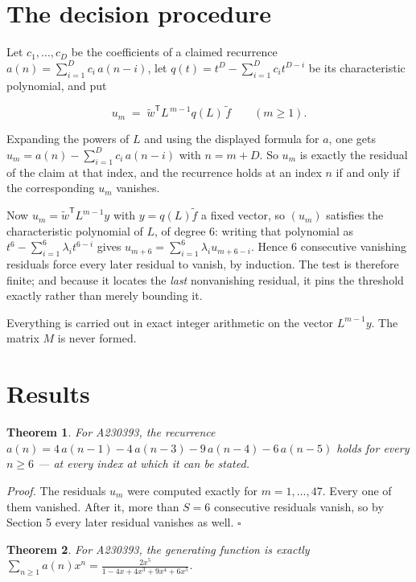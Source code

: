 \documentclass[11pt]{article}
\newtheorem{theorem}{Theorem}
\theoremstyle{definition}
\begin{document}
\section{The decision procedure}

Let $c_1,\dots,c_D$ be the coefficients of a claimed recurrence $a(n) = \sum_{i=1}^{D} c_i\,a(n-i)$, let $q(t) = t^{D} - \sum_{i=1}^{D} c_i t^{D-i}$ be its characteristic polynomial, and put

\[u_m \;=\; \tilde w^{\mathsf T} L^{\,m-1} q(L)\,\tilde f \qquad (m \ge 1).\]

Expanding the powers of $L$ and using the displayed formula for $a$, one gets $u_m = a(n) - \sum_{i=1}^{D} c_i\,a(n-i)$ with $n = m + D$. So $u_m$ is exactly the residual of the claim at that index, and the recurrence holds at an index $n$ if and only if the corresponding $u_m$ vanishes.

Now $u_m = \tilde w^{\mathsf T} L^{m-1} y$ with $y = q(L)\tilde f$ a fixed vector, so $(u_m)$ satisfies the characteristic polynomial of $L$, of degree $6$: writing that polynomial as $t^{6} - \sum_{i=1}^{6} \lambda_i t^{6-i}$ gives $u_{m+6} = \sum_{i=1}^{6} \lambda_i u_{m+6-i}$. Hence $6$ consecutive vanishing residuals force every later residual to vanish, by induction. The test is therefore finite; and because it locates the {\itshape last} nonvanishing residual, it pins the threshold exactly rather than merely bounding it.

Everything is carried out in exact integer arithmetic on the vector $L^{m-1}y$. The matrix $M$ is never formed.

\section{Results}

\begin{theorem} For A230393, the recurrence $a(n) = 4\,a(n-1) - 4\,a(n-3) - 9\,a(n-4) - 6\,a(n-5)$ holds for every $n \ge 6$ --- at every index at which it can be stated.\end{theorem}

{\itshape Proof.} The residuals $u_m$ were computed exactly for $m = 1,\dots,47$. Every one of them vanished. After it, more than $S = 6$ consecutive residuals vanish, so by Section 5 every later residual vanishes as well. $\square$

\begin{theorem} For A230393, the generating function is exactly $\sum_{n\ge 1} a(n)x^n = \frac{2x^{5}}{1 - 4x + 4x^{3} + 9x^{4} + 6x^{5}}$.\end{theorem}
\end{document}
